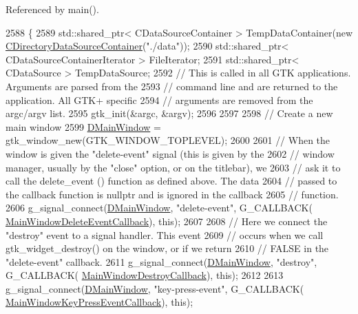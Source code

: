 Referenced by main().


\begin{DoxyCode}
2588                                                 \{
2589     std::shared\_ptr< CDataSourceContainer > TempDataContainer(\textcolor{keyword}{new} 
      \hyperlink{classCDirectoryDataSourceContainer}{CDirectoryDataSourceContainer}(\textcolor{stringliteral}{"./data"}));
2590     std::shared\_ptr< CDataSourceContainerIterator > FileIterator;
2591     std::shared\_ptr< CDataSource > TempDataSource;
2592     \textcolor{comment}{// This is called in all GTK applications. Arguments are parsed from the }
2593     \textcolor{comment}{// command line and are returned to the application. All GTK+ specific }
2594     \textcolor{comment}{// arguments are removed from the argc/argv list.}
2595     gtk\_init(&argc, &argv);
2596     
2597     
2598     \textcolor{comment}{// Create a new main window }
2599     \hyperlink{classCApplicationData_af3c57a84b4ecca8a7f86b67a0ae55372}{DMainWindow} = gtk\_window\_new(GTK\_WINDOW\_TOPLEVEL);
2600     
2601     \textcolor{comment}{// When the window is given the "delete-event" signal (this is given by the }
2602     \textcolor{comment}{// window manager, usually by the "close" option, or on the titlebar), we }
2603     \textcolor{comment}{// ask it to call the delete\_event () function as defined above. The data }
2604     \textcolor{comment}{// passed to the callback function is nullptr and is ignored in the callback }
2605     \textcolor{comment}{// function. }
2606     g\_signal\_connect(\hyperlink{classCApplicationData_af3c57a84b4ecca8a7f86b67a0ae55372}{DMainWindow}, \textcolor{stringliteral}{"delete-event"}, G\_CALLBACK(
      \hyperlink{classCApplicationData_a4b2110c03e030cf11b733955963f8854}{MainWindowDeleteEventCallback}), \textcolor{keyword}{this});
2607     
2608     \textcolor{comment}{// Here we connect the "destroy" event to a signal handler. This event }
2609     \textcolor{comment}{// occurs when we call gtk\_widget\_destroy() on the window, or if we return }
2610     \textcolor{comment}{// FALSE in the "delete-event" callback. }
2611     g\_signal\_connect(\hyperlink{classCApplicationData_af3c57a84b4ecca8a7f86b67a0ae55372}{DMainWindow}, \textcolor{stringliteral}{"destroy"}, G\_CALLBACK(
      \hyperlink{classCApplicationData_a379327c78dc57aa9dcef77e1b98efa2d}{MainWindowDestroyCallback}), \textcolor{keyword}{this});
2612     
2613     g\_signal\_connect(\hyperlink{classCApplicationData_af3c57a84b4ecca8a7f86b67a0ae55372}{DMainWindow}, \textcolor{stringliteral}{"key-press-event"}, G\_CALLBACK(
      \hyperlink{classCApplicationData_aca6cce5b1cd5142984d2880294ff6ed4}{MainWindowKeyPressEventCallback}), \textcolor{keyword}{this});

\end{DoxyCode}
